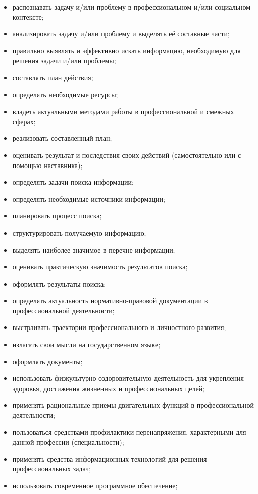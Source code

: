 \begin{itemize}
    \item распознавать задачу и/или проблему в профессиональном и/или социальном контексте;
    \item анализировать задачу и/или проблему и выделять её составные части;
    \item правильно выявлять и эффективно искать информацию, необходимую для решения задачи и/или проблемы;
    \item составлять план действия;
    \item определять необходимые ресурсы;
    \item владеть актуальными методами работы в профессиональной и смежных сферах;
    \item реализовать составленный план;
    \item оценивать результат и последствия своих действий (самостоятельно или с помощью наставника);
    \item определять задачи поиска информации;
    \item определять необходимые источники информации;
    \item планировать процесс поиска;
    \item структурировать получаемую информацию;
    \item выделять наиболее значимое в перечне информации;
    \item оценивать практическую значимость результатов поиска;
    \item оформлять результаты поиска;
    \item определять актуальность нормативно-правовой документации в профессиональной деятельности;
    \item выстраивать траектории профессионального и личностного развития;
    \item излагать свои мысли на государственном языке;
    \item оформлять документы;
    \item использовать физкультурно-оздоровительную деятельность для укрепления здоровья, достижения жизненных и профессиональных целей;
    \item применять рациональные приемы двигательных функций в профессиональной деятельности;
    \item пользоваться средствами профилактики перенапряжения, характерными для данной профессии (специальности);
    \item применять средства информационных технологий для решения профессиональных задач;
    \item использовать современное программное обеспечение;

\end{itemize}
